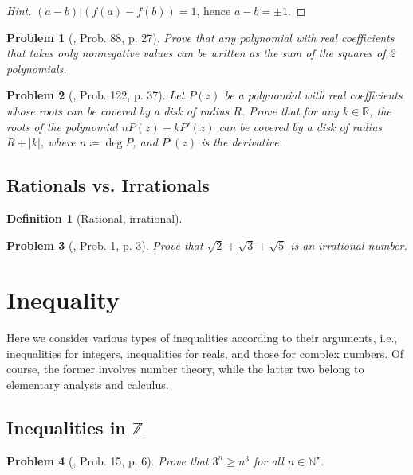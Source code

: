 \documentclass[oneside]{book}
\numberwithin{equation}{section}
\newtheorem{definition}{Definition}[section]
\newtheorem{problem}{Problem}[section]
\begin{document}
\begin{proof}[Hint]
	$(a - b)|(f(a) - f(b)) = 1$, hence $a - b = \pm 1$.
\end{proof}

\begin{problem}[\cite{Gelca_Andreescu2017}, Prob. 88, p. 27]
	Prove that any polynomial with real coefficients that takes only nonnegative values can be written as the sum of the squares of 2 polynomials.
\end{problem}

\begin{problem}[\cite{Gelca_Andreescu2017}, Prob. 122, p. 37]
	Let $P(z)$ be a polynomial with real coefficients whose roots can be covered by a disk of radius $R$. Prove that for any $k\in\mathbb{R}$, the roots of the polynomial $nP(z) - kP'(z)$ can be covered by a disk of radius $R + |k|$, where $n\coloneqq\deg P$, and $P'(z)$ is the derivative.
\end{problem}

\subsection{Rationals vs. Irrationals}
\begin{definition}[Rational, irrational]
	
\end{definition}
\begin{problem}[\cite{Gelca_Andreescu2017}, Prob. 1, p. 3]
	Prove that $\sqrt{2} + \sqrt{3} + \sqrt{5}$ is an irrational number.
\end{problem}

\section{Inequality}
Here we consider various types of inequalities according to their arguments, i.e., inequalities for integers, inequalities for reals, and those for complex numbers. Of course, the former involves number theory, while the latter two belong to elementary analysis and calculus.

\subsection{Inequalities in $\mathbb{Z}$}

\begin{problem}[\cite{Gelca_Andreescu2017}, Prob. 15, p. 6]
	Prove that $3^n\ge n^3$ for all $n\in\mathbb{N}^\star$.
\end{problem}
\end{document}
